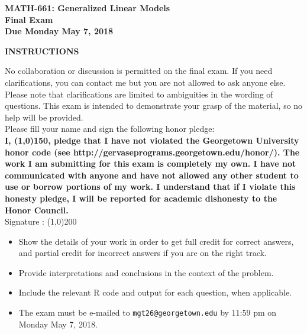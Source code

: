 \documentclass[11pt]{article}
\begin{document}
\begin{center}
{ \bf MATH-661: Generalized Linear Models \\
Final Exam  \\
Due Monday May 7, 2018 }
\end{center}

\thispagestyle{empty}


\vspace*{5mm} \centerline{\bf INSTRUCTIONS} \vspace{5mm}

No collaboration or discussion is permitted on the final exam.  If you need clarifications, you can contact me but you are not allowed to ask anyone else.  Please note that clarifications are limited to ambiguities in the wording of questions.  This exam is intended to demonstrate your grasp of the material, so no help will be provided. \\

Please fill your name and sign the following honor pledge: \\
{\bf I, \line(1,0){150}, pledge that I have not violated the Georgetown University honor code (see http://gervaseprograms.georgetown.edu/honor/).  The work I am submitting for this exam is completely my own. I have not communicated with anyone and have not allowed any other student to use or borrow portions of my work.  I understand that if I violate this honesty pledge, I will be reported for academic dishonesty to the Honor Council.} \\
Signature : \line(1,0){200} \\

\vspace*{1cm}

\begin{itemize}
\item Show the details of your work in order to get full credit for correct answers, and partial credit for incorrect answers if you are on the right track. \vspace{-2mm}
\item Provide interpretations and conclusions in the context of the problem. \vspace{-2mm}
\item Include the relevant R code and output for each question, when applicable. \vspace{-2mm}
\item The exam must be e-mailed to {\tt mgt26@georgetown.edu} by 11:59 pm on Monday May 7, 2018.
\end{itemize}
\end{document}
